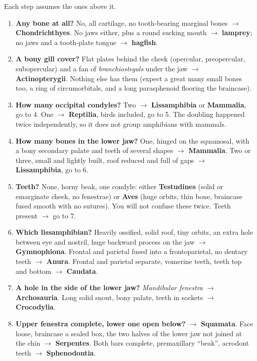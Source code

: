 \documentclass[11pt]{article}
\newcommand{\term}[1]{\textsl{#1}}
\begin{document}
Each step assumes the ones above it.

\begin{enumerate}[leftmargin=1.9em]
\item \textbf{Any bone at all?} No, all cartilage, no tooth-bearing marginal
  bones $\rightarrow$ \textbf{Chondrichthyes}. No jaws either, plus a round
  sucking mouth $\rightarrow$ \textbf{lamprey}; no jaws and a tooth-plate
  tongue $\rightarrow$ \textbf{hagfish}.
\item \textbf{A bony gill cover?} Flat plates behind the cheek (opercular,
  preopercular, subopercular) and a fan of \term{branchiostegals} under the jaw
  $\rightarrow$ \textbf{Actinopterygii}. Nothing else has them (expect a great many small bones too, a ring of
  circumorbitals, and a long parasphenoid flooring the braincase).
\item \textbf{How many occipital condyles?} Two $\rightarrow$
  \textbf{Lissamphibia} or \textbf{Mammalia}, go to 4. One $\rightarrow$
  \textbf{Reptilia}, birds included, go to 5. The doubling happened twice independently, so it does not group amphibians
  with mammals.
\item \textbf{How many bones in the lower jaw?} One, hinged on the squamosal,
  with a bony secondary palate and teeth of several shapes $\rightarrow$
  \textbf{Mammalia}. Two or three, small and lightly built, roof reduced and
  full of gaps $\rightarrow$ \textbf{Lissamphibia}, go to 6.
\item \textbf{Teeth?} None, horny beak, one condyle: either
  \textbf{Testudines} (solid or emarginate cheek, no fenestrae) or
  \textbf{Aves} (huge orbits, thin bone, braincase fused smooth with no
  sutures). You will not confuse these twice. Teeth present $\rightarrow$ go
  to 7.
\item \textbf{Which lissamphibian?} Heavily ossified, solid roof, tiny orbits,
  an extra hole between eye and nostril, huge backward process on the jaw
  $\rightarrow$ \textbf{Gymnophiona}. Frontal and parietal fused into a
  frontoparietal, no dentary teeth $\rightarrow$ \textbf{Anura}. Frontal and
  parietal separate, vomerine teeth, teeth top and bottom $\rightarrow$
  \textbf{Caudata}.
\item \textbf{A hole in the side of the lower jaw?} \term{Mandibular fenestra}
  $\rightarrow$ \textbf{Archosauria}. Long solid snout, bony palate, teeth in sockets $\rightarrow$ \textbf{Crocodylia}.
\item \textbf{Upper fenestra complete, lower one open below?} $\rightarrow$
  \textbf{Squamata}. Face loose, braincase a sealed box,
  the two halves of the lower jaw not joined at the chin $\rightarrow$
  \textbf{Serpentes}. Both bars complete, premaxillary ``beak'', acrodont teeth
  $\rightarrow$ \textbf{Sphenodontia}.
\end{enumerate}
\end{document}
